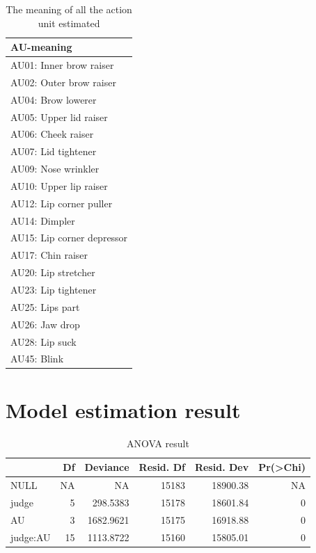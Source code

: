 \documentclass{monashthesis}
\begin{document}
\begin{table}[ht]
\begin{center}
\caption{\label{tab:au_meaning} The meaning of all the action unit estimated}
\begin{tabular}{l}
\toprule
AU-meaning \\
\midrule
AU01: Inner brow raiser \\
AU02: Outer brow raiser \\
AU04: Brow lowerer \\
AU05: Upper lid raiser \\
AU06: Cheek raiser \\
AU07: Lid tightener \\
AU09: Nose wrinkler \\
AU10: Upper lip raiser \\
AU12: Lip corner puller \\
AU14: Dimpler \\
AU15: Lip corner depressor \\
AU17: Chin raiser \\
AU20: Lip stretcher \\
AU23: Lip tightener \\
AU25: Lips part \\
AU26: Jaw drop \\
AU28: Lip suck \\
AU45: Blink \\
\bottomrule
\end{tabular}
\end{center}
\end{table}

\hypertarget{model-estimation-result}{%
\section{Model estimation result}\label{model-estimation-result}}

\begin{table}[t]

\caption{\label{tab:anova}\label{tab:anova}ANOVA result}
\centering
\begin{tabular}{l|r|r|r|r|r}
\hline
  & Df & Deviance & Resid. Df & Resid. Dev & Pr(>Chi)\\
\hline
NULL & NA & NA & 15183 & 18900.38 & NA\\
\hline
judge & 5 & 298.5383 & 15178 & 18601.84 & 0\\
\hline
AU & 3 & 1682.9621 & 15175 & 16918.88 & 0\\
\hline
judge:AU & 15 & 1113.8722 & 15160 & 15805.01 & 0\\
\hline
\end{tabular}
\end{table}
\end{document}
